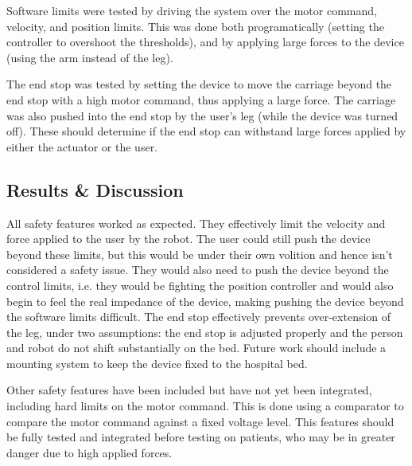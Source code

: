 \documentclass[12pt]{report}
\begin{document}
Software limits were tested by driving the system over the motor command, velocity, and position limits. This was done both programatically (setting the controller to overshoot the thresholds), and by applying large forces to the device (using the arm instead of the leg). 

The end stop was tested by setting the device to move the carriage beyond the end stop with a high motor command, thus applying a large force. The carriage was also pushed into the end stop by the user's leg (while the device was turned off). These should determine if the end stop can withstand large forces applied by either the actuator or the user. 
	
	\subsection{Results \& Discussion}

All safety features worked as expected. They effectively limit the velocity and force applied to the user by the robot. The user could still push the device beyond these limits, but this would be under their own volition and hence isn't considered a safety issue. They would also need to push the device beyond the control limits, i.e. they would be fighting the position controller and would also begin to feel the real impedance of the device, making pushing the device beyond the software limits difficult. The end stop effectively prevents over-extension of the leg, under two assumptions: the end stop is adjusted properly and the person and robot do not shift substantially on the bed. Future work should include a mounting system to keep the device fixed to the hospital bed. 


Other safety features have been included but have not yet been integrated, including hard limits on the motor command. This is done using a comparator to compare the motor command against a fixed voltage level. This features should be fully tested and integrated before testing on patients, who may be in greater danger due to high applied forces. 


	
\end{document}
